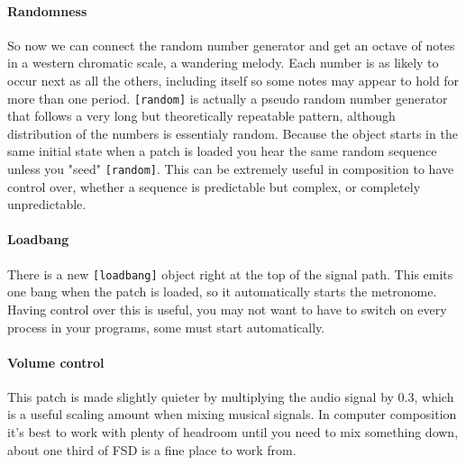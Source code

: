 \paragraph{Randomness}
So now we can connect the random number generator and get an octave of
notes in a western chromatic scale, a wandering melody. Each number is as likely to occur
next as all the others, including itself so some notes may appear to hold
for more than one period. \verb+[random]+ is actually a pseudo random number
generator that follows a very long but theoretically repeatable pattern,
although distribution of the numbers is essentialy random. Because the
object starts in the same initial state when a patch is loaded you
hear the same random sequence unless you "seed" \verb+[random]+. This
can be extremely useful in composition to have control over, whether 
a sequence is predictable but complex, or completely unpredictable. 

\paragraph{Loadbang}
There is a new \verb+[loadbang]+ object right at the top of the signal path. This emits
one bang when the patch is loaded, so it automatically starts the metronome. Having
control over this is useful, you may not want to have to switch on every process
in your programs, some must start automatically.

\paragraph{Volume control}
This patch is made slightly quieter by multiplying the audio signal by 0.3, which 
is a useful scaling amount when mixing musical signals. In computer composition it's
best to work with plenty of headroom until you need to mix something down, about
one third of FSD is a fine place to work from.
